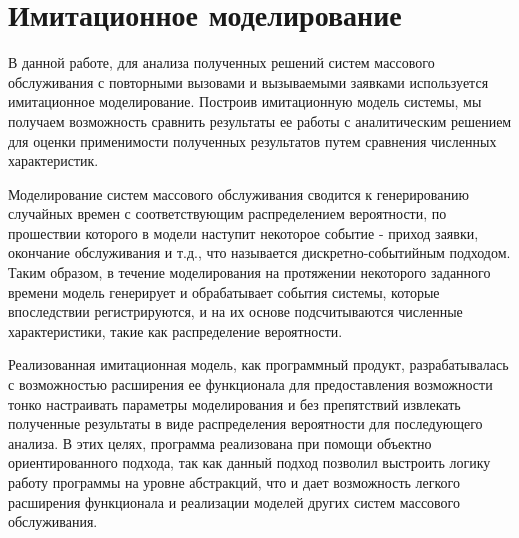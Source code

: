 \section{Имитационное моделирование}
В данной работе, для анализа полученных решений систем массового обслуживания с повторными вызовами и вызываемыми заявками используется имитационное моделирование. Построив имитационную модель системы, мы получаем возможность сравнить результаты ее работы с аналитическим решением для  оценки применимости полученных результатов путем сравнения численных характеристик.

Моделирование систем массового обслуживания сводится к генерированию случайных времен с соответствующим распределением вероятности, по прошествии которого в модели наступит некоторое событие - приход заявки, окончание обслуживания и т.д., что называется дискретно-событийным подходом. Таким образом, в течение моделирования на протяжении некоторого заданного времени модель генерирует и обрабатывает события системы, которые впоследствии регистрируются, и на их основе подсчитываются численные характеристики, такие как распределение вероятности.

Реализованная имитационная модель, как программный продукт, разрабатывалась с возможностью расширения ее функционала для предоставления возможности тонко настраивать параметры моделирования и без препятствий извлекать полученные результаты в виде распределения вероятности для последующего анализа. В этих целях, программа реализована при помощи объектно ориентированного подхода, так как данный подход позволил выстроить логику работу программы на уровне абстракций, что и дает возможность легкого расширения функционала и реализации моделей других систем массового обслуживания.


